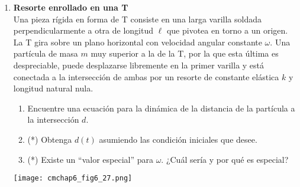 \documentclass[11pt, a4paper, twoside]{article}
\begin{document}
\begin{enumerate}
\item
	\begin{minipage}[t][5cm]{0.7\textwidth}
		\textbf{Resorte enrollado en una T}\\
		Una pieza rígida en forma de T consiste en una larga varilla soldada perpendicularmente a otra de longitud \(\ell\) que pivotea en torno a un origen.
		La T gira sobre un plano horizontal con velocidad angular constante \(\omega\).
		Una partícula de masa \(m\) muy superior a la de la T, por la que esta última es despreciable, puede desplazarse libremente en la primer varilla y está conectada a la intersección de ambas por un resorte de constante elástica \(k\) y longitud natural nula.
		\begin{enumerate}
			\item  Encuentre una ecuación para la dinámica de la distancia de la partícula a la intersección \(d\).
			\item (*) Obtenga \(d(t)\) asumiendo las condición iniciales que desee. 
			\item (*) Existe un ``valor especial'' para \(\omega\). ¿Cuál sería y por qué es especial?
		\end{enumerate}
	\end{minipage}
	\begin{minipage}[c][0cm][t]{0.3\textwidth}
		\texttt{[image: cmchap6\_fig6\_27.png]}
	\end{minipage}


\end{enumerate}
\end{document}
